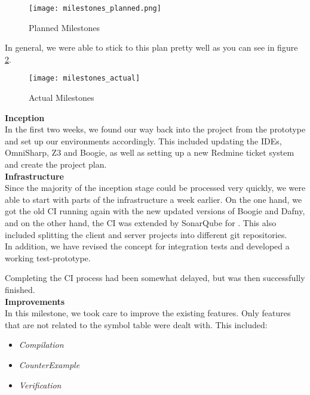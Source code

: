 \begin{figure}[H]
    \centering
    \texttt{[image: milestones\_planned.png]}
    \caption{Planned Milestones}
    \label{fig:planned_milestones}
\end{figure}

In general, we were able to stick to this plan pretty well as you can see in figure \ref{fig:actual_milestones}.

\begin{figure}[H]
    \centering
    \texttt{[image: milestones\_actual]}
    \caption{Actual Milestones}
    \label{fig:actual_milestones}
\end{figure}

{\bf Inception}\\
In the first two weeks, we found our way back into the project from the prototype
and set up our environments accordingly.
This included updating the IDEs, OmniSharp, Z3 and Boogie,
as well as setting up a new Redmine ticket system and create the project plan.\\

{\bf Infrastructure}\\
Since the majority of the inception stage could be processed very quickly,
we were able to start with parts of the infrastructure a week earlier.
On the one hand, we got the old CI running again with the new updated versions of Boogie and Dafny,
and on the other hand, the CI was extended by SonarQube for \Csharp.
This also included splitting the client and server projects into different git repositories.\\

In addition, we have revised the concept for integration tests and developed
a working test-prototype.

Completing the CI process had been somewhat delayed, but was then successfully finished.\\

{\bf Improvements}\\
In this milestone, we took care to improve the existing features.
Only features that are not related to the symbol table were dealt with.
This included:
\begin{multicols}{3}
\begin{itemize}
    \item \textit{Compilation}
    \item \textit{CounterExample}
    \item \textit{Verification}
\end{itemize}
\end{multicols}

